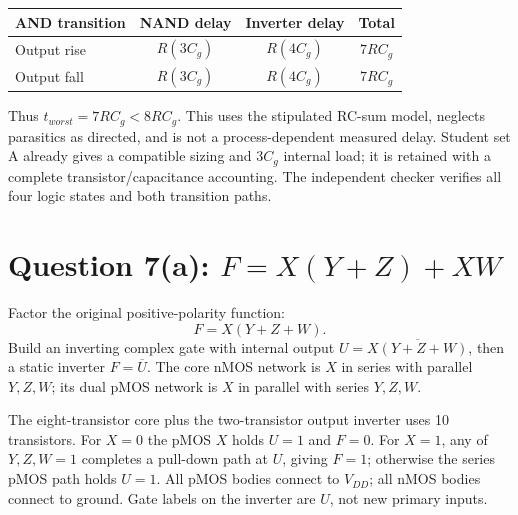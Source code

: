 \documentclass[10pt]{article}
\newcommand{\mos}[4]{\begin{scope}[shift={(#1,#2)}]
\draw(0,.24)--(0,-.24);\draw(0,.2)--(.25,.2)--(.25,.5);\draw(0,-.2)--(.25,-.2)--(.25,-.5);
\draw(-.16,.23)--(-.16,-.23);
\ifnum#4=1\draw(-.26,0)circle(.06);\draw(-.75,0)--(-.32,0);\else\draw(-.75,0)--(-.16,0);\fi
\node[anchor=east,font=\scriptsize]at(-.76,0){$#3$};\end{scope}}
\newcommand{\gnd}[2]{\draw(#1,#2)--(#1,{#2-.12});\draw({#1-.17},{#2-.12})--({#1+.17},{#2-.12});\draw({#1-.11},{#2-.2})--({#1+.11},{#2-.2});}
\newcommand{\rail}[3]{\draw(#1,#2)--(#1,{#2+.14});\node[above,font=\scriptsize]at(#1,{#2+.14}){$#3$};}
\begin{document}
\begin{center}\begin{tabular}{lccc}\toprule
AND transition&NAND delay&Inverter delay&Total\\\midrule
Output rise&$R(3C_g)$&$R(4C_g)$&$7RC_g$\\
Output fall&$R(3C_g)$&$R(4C_g)$&$7RC_g$\\\bottomrule
\end{tabular}\end{center}
Thus $\boxed{t_{worst}=7RC_g<8RC_g}$. This uses the stipulated RC-sum model, neglects parasitics as directed, and is not a process-dependent measured delay. Student set A already gives a compatible sizing and $3C_g$ internal load; it is retained with a complete transistor/capacitance accounting. The independent checker verifies all four logic states and both transition paths.

\newpage\section*{Question 7(a): $F=X(Y+Z)+XW$}
Factor the original positive-polarity function:
\[F=X(Y+Z+W).\]
Build an inverting complex gate with internal output $U=\overline{X(Y+Z+W)}$, then a static inverter $F=\overline U$. The core nMOS network is $X$ in series with parallel $Y,Z,W$; its dual pMOS network is $X$ in parallel with series $Y,Z,W$.
\begin{center}\end{center}
The eight-transistor core plus the two-transistor output inverter uses 10 transistors. For $X=0$ the pMOS $X$ holds $U=1$ and $F=0$. For $X=1$, any of $Y,Z,W=1$ completes a pull-down path at $U$, giving $F=1$; otherwise the series pMOS path holds $U=1$. All pMOS bodies connect to $V_{DD}$; all nMOS bodies connect to ground. Gate labels on the inverter are $U$, not new primary inputs.
\end{document}
